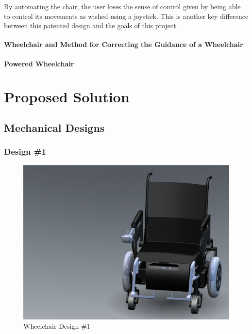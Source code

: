 \documentclass[oneside,final,a4paper]{report}
\begin{document}
By automating the chair, the user loses the sense of control given by being able to control its movements as wished using a joystick. This is another key difference between this patented design and the goals of this project.


\subsubsection{Wheelchair and Method for Correcting the Guidance of a Wheelchair}
\subsubsection{Powered Wheelchair}

\chapter{Proposed Solution}

\section{Mechanical Designs}
\subsection{Design \#1}
\begin{figure}[hbt]
 \centering
 \includegraphics[scale=0.15]{WheelChair_1}
 \caption{Wheelchair Design \#1}
\end{figure}
\end{document}
